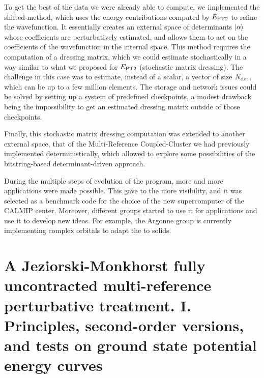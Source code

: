 \documentclass[12pt,a4paper]{report}
\begin{document}
To get the best of the data we were already able to compute, we implemented the shifted-\Bk method, which uses the energy contributions computed by $E_\text{PT2}$ to refine the wavefunction. It essentially creates an external space of determinants ${\ket{\alpha}}$ whose coefficients are perturbatively estimated, and allows them to act on the coefficients of the wavefunction in the internal space. This method requires the computation of a dressing matrix, which we could estimate stochastically in a way similar to what we proposed for $E_\text{PT2}$ (stochastic matrix dressing).
The challenge in this case was to estimate, instead of a scalar, a vector of size ${N_\text{det}}$, which can be up to a few million elements. The storage and network issues could be solved by setting up a system of predefined checkpoints, a modest drawback being the impossibility to get an estimated dressing matrix outside of those checkpoints.

Finally, this stochastic matrix dressing computation was extended to another external space, that of the Multi-Reference Coupled-Cluster we had previously implemented deterministically,\cite{Garniron_2017} which allowed to explore some possibilities of the bitstring-based determinant-driven approach.

During the multiple steps of evolution of the program, more and more applications were made possible.\cite{Loos_2018,Garniron_2018,Giner_2017,Garniron_2017,Garniron_2017b,Scemama_2018,1806.05115} This gave to the \QP more visibility, and it was selected as a benchmark code for the choice of the new supercomputer of the CALMIP center. Moreover, different groups started to use it for applications and use it to develop new ideas. For example, the Argonne group is currently implementing complex orbitals to 
adapt the \QP to solids.

\appendix

\chapter{A Jeziorski-Monkhorst fully uncontracted multi-reference perturbative treatment. I. Principles, second-order versions, and tests on ground state potential energy curves \cite{Giner_2017}}





%
\end{document}
